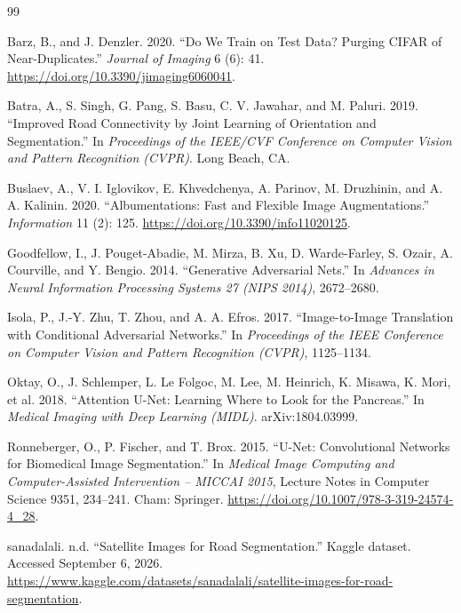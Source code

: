 \documentclass[11pt]{article}
\begin{document}
\begin{thebibliography}{99}

 Barz, B., and J. Denzler. 2020. ``Do We Train on Test Data? Purging CIFAR of Near-Duplicates.'' \emph{Journal of Imaging} 6 (6): 41. \url{https://doi.org/10.3390/jimaging6060041}.

 Batra, A., S. Singh, G. Pang, S. Basu, C. V. Jawahar, and M. Paluri. 2019. ``Improved Road Connectivity by Joint Learning of Orientation and Segmentation.'' In \emph{Proceedings of the IEEE/CVF Conference on Computer Vision and Pattern Recognition (CVPR)}. Long Beach, CA.

 Buslaev, A., V. I. Iglovikov, E. Khvedchenya, A. Parinov, M. Druzhinin, and A. A. Kalinin. 2020. ``Albumentations: Fast and Flexible Image Augmentations.'' \emph{Information} 11 (2): 125. \url{https://doi.org/10.3390/info11020125}.

 Goodfellow, I., J. Pouget-Abadie, M. Mirza, B. Xu, D. Warde-Farley, S. Ozair, A. Courville, and Y. Bengio. 2014. ``Generative Adversarial Nets.'' In \emph{Advances in Neural Information Processing Systems 27 (NIPS 2014)}, 2672--2680.

 Isola, P., J.-Y. Zhu, T. Zhou, and A. A. Efros. 2017. ``Image-to-Image Translation with Conditional Adversarial Networks.'' In \emph{Proceedings of the IEEE Conference on Computer Vision and Pattern Recognition (CVPR)}, 1125--1134.

 Oktay, O., J. Schlemper, L. Le Folgoc, M. Lee, M. Heinrich, K. Misawa, K. Mori, et al. 2018. ``Attention U-Net: Learning Where to Look for the Pancreas.'' In \emph{Medical Imaging with Deep Learning (MIDL)}. arXiv:1804.03999.

 Ronneberger, O., P. Fischer, and T. Brox. 2015. ``U-Net: Convolutional Networks for Biomedical Image Segmentation.'' In \emph{Medical Image Computing and Computer-Assisted Intervention -- MICCAI 2015}, Lecture Notes in Computer Science 9351, 234--241. Cham: Springer. \url{https://doi.org/10.1007/978-3-319-24574-4_28}.

 sanadalali. n.d. ``Satellite Images for Road Segmentation.'' Kaggle dataset. Accessed September 6, 2026. \url{https://www.kaggle.com/datasets/sanadalali/satellite-images-for-road-segmentation}.


\end{thebibliography}
\end{document}
